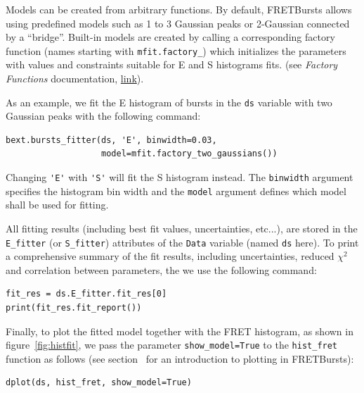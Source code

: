 \documentclass[10pt,letterpaper]{article}
\begin{document}
Models can be created from arbitrary functions. By default,
FRETBursts allows using predefined models such as 1 to 3 Gaussian
peaks or 2-Gaussian connected by a ``bridge''.
Built-in models are created by calling a corresponding factory function
(names starting with \verb|mfit.factory_|) which initializes the parameters
with values and constraints suitable for E and S histograms fits.
(see \textit{Factory Functions} documentation,
\href{http://fretbursts.readthedocs.org/en/latest/mfit.html#model-factory-functions}{link}).

As an example, we fit the E histogram of bursts in the
\verb|ds| variable with two Gaussian peaks with the following command:

\begin{lstlisting}
bext.bursts_fitter(ds, 'E', binwidth=0.03,
                   model=mfit.factory_two_gaussians())
\end{lstlisting}

Changing \verb|'E'| with \verb|'S'| will fit the S histogram instead.
The \verb|binwidth| argument specifies the histogram bin width and
the \verb|model| argument defines which model shall be used for
fitting.

All fitting results (including best fit values, uncertainties, etc...),
are stored in the \verb|E_fitter| (or \verb|S_fitter|)
attributes of the \verb|Data| variable (named \verb|ds| here).
To print a comprehensive summary of the fit results, including
uncertainties, reduced $\chi^2$ and correlation between parameters,
the we use the following command:

\begin{lstlisting}
fit_res = ds.E_fitter.fit_res[0]
print(fit_res.fit_report())
\end{lstlisting}

Finally, to plot the fitted model together with the FRET histogram,
as shown in figure~\ref{fig:histfit}, we pass the parameter \verb|show_model=True|
to the \verb|hist_fret| function as follows
(see section~ for an introduction to plotting in FRETBursts):

\begin{lstlisting}
dplot(ds, hist_fret, show_model=True)
\end{lstlisting}
\end{document}
